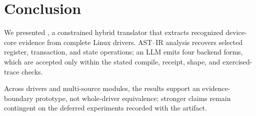 \section{Conclusion}
\label{sec:conclusion}

We presented \reharness{}, a constrained hybrid translator that extracts
recognized device-core evidence from complete Linux drivers. AST--IR analysis
recovers selected register, transaction, and state operations; an LLM emits
four backend forms, which are accepted only within the stated compile, receipt,
shape, and exercised-trace checks.

Across \EvalDrivers{} drivers and \MultiSourceDrivers{} multi-source modules,
the results support an evidence-boundary prototype, not whole-driver equivalence;
stronger claims remain contingent on the deferred experiments recorded with the
artifact.


